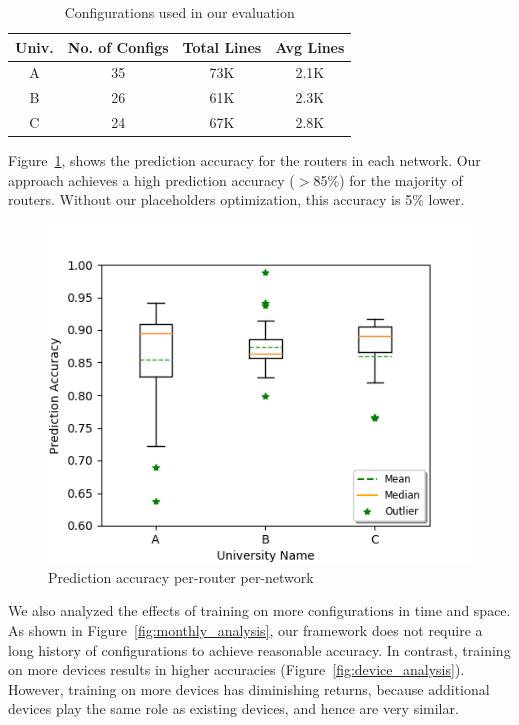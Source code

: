 \begin{table}
    \small \centering
    \begin{tabular}{ | c | c | c | c |}
    \hline
        {\bf Univ.} & {\bf No. of Configs} & {\bf Total Lines} & {\bf Avg
    Lines} \\ 
    \hline
    A & 35 & 73K & 2.1K \\ 
    B & 26 & 61K & 2.3K \\ 
    C & 24 & 67K & 2.8K \\ 
    \hline
    \end{tabular}
    \caption{Configurations used in our evaluation}
    \vspace{-1em}
    \label{tab:datasets}
\end{table}


Figure~\ref{fig:uni_analysis}, shows the prediction accuracy for
the routers in each network. Our approach achieves a high prediction accuracy
($>$85\%) for the majority of routers. Without our placeholders optimization,
this accuracy is 5\% lower.

\begin{figure}
    \centering
	\includegraphics[width=0.6\columnwidth]{uni_analysis.png}
	\caption{Prediction accuracy per-router per-network}
    \vspace{-1em}
    \label{fig:uni_analysis}
\end{figure}

We also analyzed the effects of training on more configurations in time and
space. As shown in Figure~\ref{fig:monthly_analysis}, our framework does not
require a long history of configurations to achieve reasonable accuracy. In
contrast, training on more devices results in higher accuracies
(Figure~\ref{fig:device_analysis}). However, training on more devices has
diminishing returns, because additional devices play the same role as
existing devices, and hence are very similar.


